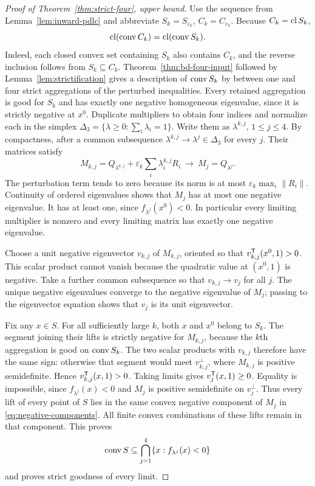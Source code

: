 \begin{proof}[Proof of Theorem~\ref{thm:strict-four}, upper bound]
Use the sequence from Lemma~\ref{lem:inward-pdlc} and abbreviate
$S_k=S_{\varepsilon_k}$, $C_k=C_{\varepsilon_k}$.
Because $C_k=\operatorname{cl} S_k$,
\[
 \operatorname{cl}(\operatorname{conv} C_k)=\operatorname{cl}(\operatorname{conv} S_k).
\]
Indeed, each closed convex set containing $S_k$ also contains $C_k$,
and the reverse inclusion follows from $S_k\subseteq C_k$.
Theorem~\ref{thm:bd-four-input} followed by
Lemma~\ref{lem:strictification} gives a description of $\operatorname{conv} S_k$
by between one and four strict aggregations of the perturbed inequalities.
Every retained aggregation is good for $S_k$ and has exactly one
negative homogeneous eigenvalue, since it is strictly negative at $x^0$.
Duplicate multipliers to obtain four indices and normalize each in
the simplex $\Delta_3=\{\lambda\geq0:\sum_i\lambda_i=1\}$.
Write them as $\lambda^{k,j}$, $1\leq j\leq4$. By compactness,
after a common subsequence
$\lambda^{k,j}\to\lambda^j\in\Delta_3$ for every $j$.
Their matrices satisfy
\begin{equation}\label{eq:four-matrix-limit}
 M_{k,j}=Q_{\lambda^{k,j}}
       +\varepsilon_k\sum_i\lambda_i^{k,j}R_i
 \ \longrightarrow\ M_j=Q_{\lambda^j}.
\end{equation}
The perturbation term tends to zero because its norm is at most
$\varepsilon_k\max_i\|R_i\|$. Continuity of ordered eigenvalues
shows that $M_j$ has at most one negative eigenvalue. It has at least
one, since $f_{\lambda^j}(x^0)<0$. In particular every limiting
multiplier is nonzero and every limiting matrix has exactly one negative
eigenvalue.

Choose a unit negative eigenvector $v_{k,j}$ of $M_{k,j}$, oriented
so that $v_{k,j}^{\mathsf T}(x^0,1)>0$. This scalar product cannot
vanish because the quadratic value at $(x^0,1)$ is negative. Take a
further common subsequence so that $v_{k,j}\to v_j$ for all $j$.
The unique negative eigenvalues converge to the negative eigenvalue of
$M_j$; passing to the eigenvector equation shows that $v_j$ is its
unit eigenvector.

Fix any $x\in S$. For all sufficiently large $k$, both $x$ and $x^0$
belong to $S_k$. The segment joining their lifts is strictly negative
for $M_{k,j}$, because the $k$th aggregation is good on $\operatorname{conv} S_k$.
The two scalar products with $v_{k,j}$ therefore have the same sign:
otherwise that segment would meet $v_{k,j}^{\perp}$, where $M_{k,j}$
is positive semidefinite. Hence $v_{k,j}^{\mathsf T}(x,1)>0$.
Taking limits gives $v_j^{\mathsf T}(x,1)\geq0$. Equality is
impossible, since $f_{\lambda^j}(x)<0$ and $M_j$ is positive
semidefinite on $v_j^\perp$. Thus every lift of every point of $S$
lies in the same convex negative component of $M_j$ in
\eqref{eq:negative-components}. All finite convex combinations of these
lifts remain in that component. This proves
\[
 \operatorname{conv} S\subseteq\bigcap_{j=1}^4\{x:f_{\lambda^j}(x)<0\}
\]
and proves strict goodness of every limit.


\end{proof}
